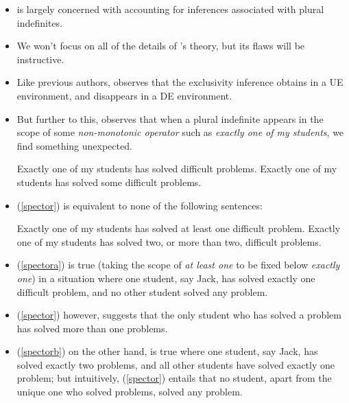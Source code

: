 \documentclass[landscape,twocolumn,cronos,paper=letter]{ling-handout}
\begin{document}
\begin{itemize}

    \item \citeauthor{spector2007} is largely concerned with accounting for
    inferences associated with plural indefinites.

    \item We won't focus on all of the details of \citeauthor{spector2007}'s
    theory, but its flaws will be instructive.

    \item Like previous authors, \citeauthor{spector2007} observes that the
    exclusivity inference obtains in a UE environment, and disappears in a DE environment.

    \item But further to this, \citet{spector2007} observes that when a plural
    indefinite appears in the scope of some \textit{non-monotonic operator} such
    as \textit{exactly one of my students}, we find something unexpected.

\pex
\a\label{spector}Exactly one of my students has solved difficult problems.
\a Exactly one of my students has solved some difficult problems.
\xe

  \item (\ref{spector}) is equivalent to none of the following sentences:

    \pex
    \a\label{spectora}Exactly one of my students has solved at least one difficult problem.
    \a\label{spectorb}Exactly one of my students has solved two, or more than two, difficult problems.
    \xe

  \item (\ref{spectora}) is true (taking the scope of \textit{at least one} to be
    fixed below \textit{exactly one}) in a situation where one student, say
    Jack, has solved exactly one difficult problem, and no other student solved
    any problem.

  \item (\ref{spector}) however, suggests that the only student who has solved a
    problem has solved more than one problems.

  \item (\ref{spectorb}) on the other hand, is true where one student, say Jack,
    has solved exactly two problems, and all other students have solved exactly
    one problem; but intuitively, (\ref{spector}) entails that no student, apart
    from the unique one who solved problems, solved any problem.


\end{itemize}
\end{document}
